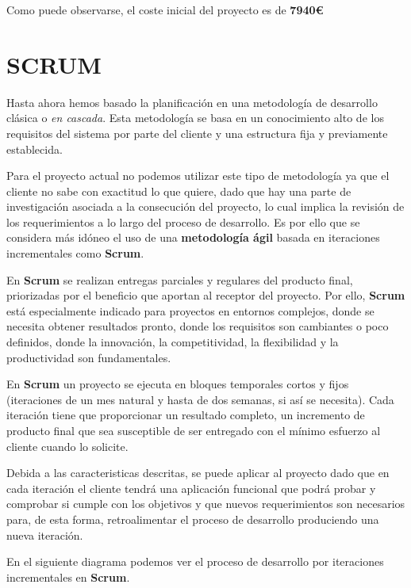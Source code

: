 \bigskip
Como puede observarse, el coste inicial del proyecto es de \textbf{7940\euro}

\section{SCRUM}

Hasta ahora hemos basado la planificación en una metodología de desarrollo clásica o \textit{en cascada}. Esta metodología se basa en un conocimiento alto de los requisitos del sistema por parte del cliente y una estructura fija y previamente establecida. 

\bigskip
Para el proyecto actual no podemos utilizar este tipo de metodología ya que el cliente no sabe con exactitud lo que quiere, dado que hay una parte de investigación asociada a la consecución del proyecto, lo cual implica la revisión de los requerimientos a lo largo del proceso de desarrollo. Es por ello que se considera más idóneo el uso de una \textbf{metodología ágil} basada en iteraciones incrementales como \textbf{Scrum}.

\bigskip
En \textbf{Scrum} se realizan entregas parciales y regulares del producto final, priorizadas por el beneficio que aportan al receptor del proyecto. Por ello, \textbf{Scrum} está especialmente indicado para proyectos en entornos complejos, donde se necesita obtener resultados pronto, donde los requisitos son cambiantes o poco definidos, donde la innovación, la competitividad, la flexibilidad y la productividad son fundamentales.

\bigskip
En \textbf{Scrum} un proyecto se ejecuta en bloques temporales cortos y fijos (iteraciones de un mes natural y hasta de dos semanas, si así se necesita). Cada iteración tiene que proporcionar un resultado completo, un incremento de producto final que sea susceptible de ser entregado con el mínimo esfuerzo al cliente cuando lo solicite.

\bigskip
Debida a las caracteristicas descritas, se puede aplicar al proyecto dado que en cada iteración el cliente tendrá una aplicación funcional que podrá probar y comprobar si cumple con los objetivos y que nuevos requerimientos son necesarios para, de esta forma, retroalimentar el proceso de desarrollo produciendo una nueva iteración.

\bigskip
En el siguiente diagrama podemos ver el proceso de desarrollo por iteraciones incrementales en \textbf{Scrum}.

